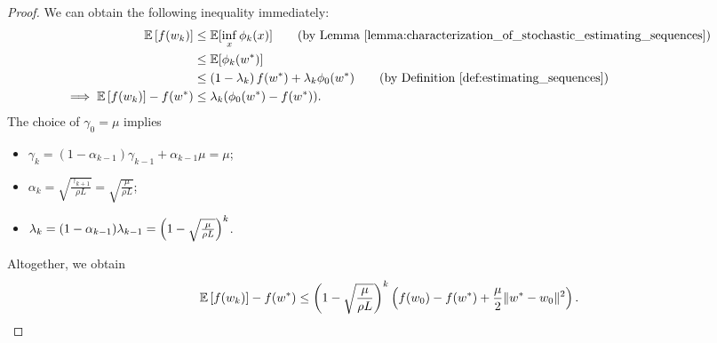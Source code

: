 \scAcceleration*
\begin{proof}
    We can obtain the following inequality immediately:
    \begin{align*}
        \E\sbr{f(\wk)} &\leq \E[\inf_x \phi_k(x)] \tag{by Lemma~\ref{lemma:characterization_of_stochastic_estimating_sequences}}\\
        &\leq \E[\phi_k(\wopt)] \\
        &\leq \rbr{1 - \lambda_k} f(\wopt) + \lambda_k \phi_0(\wopt) \tag{by Definition~\ref{def:estimating_sequences}}\\
        \implies \E\sbr{f(\wk)} - f(\wopt) &\leq \lambda_k (\phi_0(\wopt) - f(\wopt)).
    \end{align*}
    The choice of \( \gamma_0 = \mu \) implies
    \begin{itemize}
        \item \(  \gamma_{k}  = (1 - \alpha_{k-1}) \gamma_{k-1} + \alpha_{k-1} \mu = \mu \);
        \item \( \alpha_{k} = \sqrt{\frac{\gamma_{k+1}}{\rho L}} = \sqrt{\frac{\mu}{\rho L}} \);
        \item \( \lambda_{k} = (1 - \alpha_{k-1}) \lambda_{k-1} = \left(1 - \sqrt{\frac{\mu}{\rho L}}\right)^{k} \).
    \end{itemize}
    Altogether, we obtain
    \[ \mathbb{E}\left[f(w_k)\right] - f(w^*) \leq \left(1 - \sqrt{\frac{\mu}{\rho L}}\right)^{k} \left( f(w_0) - f(w^*) + \frac{\mu}{2} \|w^* - w_0\|^2 \right). \]
\end{proof}
